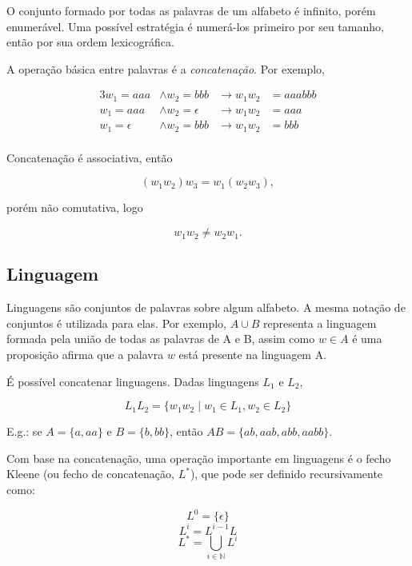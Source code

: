 \documentclass[a4paper,12pt,oneside,onecolumn]{uerj}
\begin{document}
O conjunto formado por todas as palavras de um alfabeto é infinito, porém enumerável. Uma possível estratégia é numerá-los primeiro por seu tamanho, então por sua ordem lexicográfica.

A operação básica entre palavras é a \emph{concatenação}. Por exemplo, 

\begin{alignat*}{3}
w_1 = aaa &\wedge w_2=bbb  &\rightarrow w_1w_2 &= aaabbb \\
w_1 = aaa &\wedge w_2=\epsilon  &\rightarrow w_1w_2 &= aaa \\
w_1 = \epsilon &\wedge w_2=bbb  &\rightarrow w_1w_2 &= bbb \\
\end{alignat*}

Concatenação é associativa, então 

\begin{equation*}
(w_1w_2)w_3 = w_1(w_2w_3),
\end{equation*}

porém não comutativa, logo

\begin{equation*}
w_1w_2 \neq w_2w_1.
\end{equation*}

\subsection{Linguagem}

Linguagens são conjuntos de palavras sobre algum alfabeto. A mesma notação de conjuntos é utilizada para elas. Por exemplo, $A \cup B$ representa a linguagem formada pela união de todas as palavras de A e B, assim como $w \in A$ é uma proposição afirma que a palavra $w$ está presente na linguagem A.

É possível concatenar linguagens. Dadas linguagens $L_1$ e $L_2$,

\begin{equation*}
	L_1L_2 = \{w_1w_2 \mid w_1 \in L_1, w_2 \in L_2\}
\end{equation*}

E.g.: se $A = \{a, aa\}$ e $B = \{b, bb\}$, então $AB = \{ab, aab, abb, aabb\}$.


Com base na concatenação, uma operação importante em linguagens é o fecho Kleene (ou fecho de concatenação, $L^*$), que pode ser definido recursivamente como:

\begin{equation*}
	L^0 = \{\epsilon\}
\end{equation*}
\begin{equation*}
	L^i = L^{i-1}L
\end{equation*}
\begin{equation*}
	L^* = \bigcup_{i \in \mathbb{N}} L^i
\end{equation*}
\end{document}
